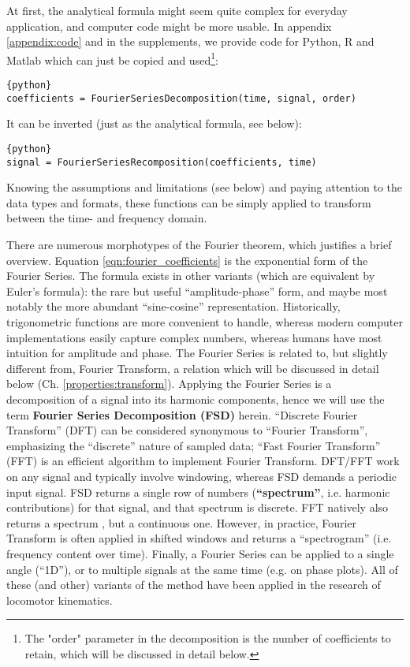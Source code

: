 At first, the analytical formula might seem quite complex for everyday application, and computer code might be more usable.
In appendix \ref{appendix:code} and in the supplements, we provide code for Python, R and Matlab which can just be copied and used\footnote{The "order" parameter in the decomposition is the number of coefficients to retain, which will be discussed in detail below.}:
\begin{lstlisting}{python}
coefficients = FourierSeriesDecomposition(time, signal, order)
\end{lstlisting}

It can be inverted (just as the analytical formula, see below):
\begin{lstlisting}{python}
signal = FourierSeriesRecomposition(coefficients, time)
\end{lstlisting}

Knowing the assumptions and limitations (see below) and paying attention to the data types and formats, these functions can be simply applied to transform between the time- and frequency domain.


\bigskip
There are numerous morphotypes of the Fourier theorem, which justifies a brief overview.
Equation \eqref{eqn:fourier_coefficients} is the exponential form of the Fourier Series.
The formula exists in other variants (which are equivalent by Euler's formula): the rare but useful ``amplitude-phase'' form, and maybe most notably the more abundant ``sine-cosine'' representation.
Historically, trigonometric functions are more convenient to handle, whereas modern computer implementations easily capture complex numbers, whereas humans have most intuition for amplitude and phase.
The Fourier Series is related to, but slightly different from, Fourier Transform, a relation which will be discussed in detail below (Ch. \ref{properties:transform}).
Applying the Fourier Series is a decomposition of a signal into its harmonic components, hence we will use the term \textbf{Fourier Series Decomposition (FSD)} herein.
``Discrete Fourier Transform'' (DFT) can be considered synonymous to ``Fourier Transform'', emphasizing the ``discrete'' nature of sampled data; ``Fast Fourier Transform'' (FFT) is an efficient algorithm to implement Fourier Transform.
DFT/FFT work on any signal and typically involve windowing, whereas FSD demands a periodic input signal.
FSD returns a single row of numbers (\textbf{``spectrum''}, i.e. harmonic contributions) for that signal, and that spectrum is discrete.
FFT natively also returns a spectrum \citep{Welch1967}, but a continuous one.
However, in practice, Fourier Transform is often applied in shifted windows and returns a ``spectrogram'' (i.e. frequency content over time).
Finally, a Fourier Series can be applied to a single angle (``1D''), or to multiple signals at the same time (e.g. on phase plots).
All of these (and other) variants of the method have been applied in the research of locomotor kinematics.


